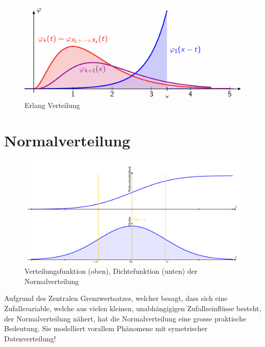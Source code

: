 \documentclass[../Main.tex]{subfiles}
\begin{document}
\begin{figure}[H]
    \centering
    \includegraphics[width=0.75\linewidth]{Images/erlang.png}
    \caption{Erlang Verteilung}
\end{figure}


\newpage

\section{Normalverteilung}

\begin{figure}[H]
    \centering
    \includegraphics[width=0.75\linewidth]{Images/normal-dichte-verteil}
    \caption{Verteilungsfunktion (oben), Dichtefunktion (unten) der Normalverteilung}
\end{figure}

Aufgrund des Zentralen Grenzwertsatzes, welcher besagt,
dass sich eine Zufallsvariable, welche aus vielen kleinen,
unabhängigigen Zufallseinflüsse besteht, der Normalverteilung
nähert, hat die Normalverteilung eine grosse praktische Bedeutung.
Sie modelliert vorallem Phänomene mit symetrischer Datenverteilung!
\end{document}
